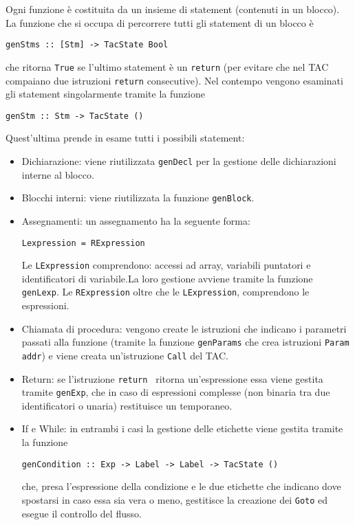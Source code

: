 
Ogni funzione è costituita da un insieme di statement (contenuti in un blocco). La funzione che si occupa di percorrere tutti gli statement di un blocco è 
\begin{center}
    {\tt genStms :: [Stm] -> TacState Bool}
\end{center}
che ritorna {\tt True} se l'ultimo statement è un {\tt return} (per evitare che nel TAC compaiano due istruzioni {\tt return} consecutive). Nel contempo vengono esaminati gli statement singolarmente tramite la funzione
\begin{center}
    {\tt genStm :: Stm -> TacState ()}
\end{center}
Quest'ultima prende in esame tutti i possibili statement:
\begin{itemize}
    \item Dichiarazione: viene riutilizzata {\tt genDecl} per la gestione delle dichiarazioni interne al blocco.
    \item Blocchi interni: viene riutilizzata la funzione {\tt genBlock}.
    \item Assegnamenti: un assegnamento ha la seguente forma:
    \begin{center}
        {\tt Lexpression = RExpression}
    \end{center}
    Le {\tt LExpression} comprendono: accessi ad array, variabili puntatori e identificatori di variabile.La loro gestione avviene tramite la funzione {\tt genLexp}. Le {\tt RExpression} oltre che le {\tt LExpression}, comprendono le espressioni.
    \item Chiamata di procedura: vengono create le istruzioni che indicano i parametri passati alla funzione (tramite la funzione {\tt genParams} che crea istruzioni {\tt Param addr}) e viene creata un'istruzione {\tt Call} del TAC.
    \item Return: se l'istruzione {\tt return } ritorna un'espressione essa viene gestita tramite {\tt genExp}, che in caso di espressioni complesse (non binaria tra due identificatori o unaria) restituisce un temporaneo.
    \item If e While: in entrambi i casi la gestione delle etichette viene gestita tramite la funzione 
    \begin{center}
        {\tt genCondition :: Exp -> Label -> Label -> TacState ()}
    \end{center}
    che, presa l'espressione della condizione e le due etichette che indicano dove spostarsi in caso essa sia vera o meno, gestitisce la creazione dei {\tt Goto} ed esegue il controllo del flusso.
\end{itemize}

